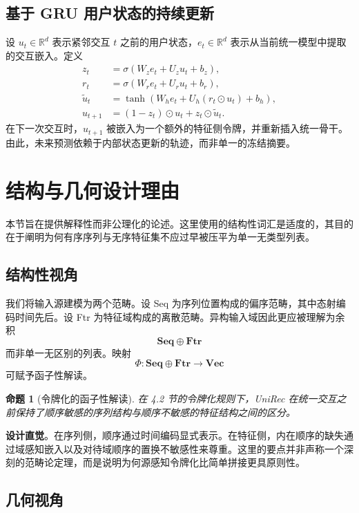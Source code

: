 \documentclass{article}
\newtheorem{proposition}{命题}
\begin{document}
\subsection{基于 GRU 用户状态的持续更新}

设 \(u_t \in \mathbb{R}^d\) 表示紧邻交互 \(t\) 之前的用户状态，\(e_t \in \mathbb{R}^d\) 表示从当前统一模型中提取的交互嵌入。定义
\[
\begin{aligned}
z_t &= \sigma(W_z e_t + U_z u_t + b_z),\\
r_t &= \sigma(W_r e_t + U_r u_t + b_r),\\
\tilde{u}_t &= \tanh(W_h e_t + U_h (r_t \odot u_t) + b_h),\\
u_{t+1} &= (1 - z_t) \odot u_t + z_t \odot \tilde{u}_t.
\end{aligned} \tag{4.10}
\]
在下一次交互时，\(u_{t+1}\) 被嵌入为一个额外的特征侧令牌，并重新插入统一骨干。由此，未来预测依赖于内部状态更新的轨迹，而非单一的冻结摘要。

\section{结构与几何设计理由}

本节旨在提供解释性而非公理化的论述。这里使用的结构性词汇是适度的，其目的在于阐明为何有序序列与无序特征集不应过早被压平为单一无类型列表。

\subsection{结构性视角}

我们将输入源建模为两个范畴。设 Seq 为序列位置构成的偏序范畴，其中态射编码时间先后。设 Ftr 为特征域构成的离散范畴。异构输入域因此更应被理解为余积
\[
\mathbf{Seq} \oplus \mathbf{Ftr}
\]
而非单一无区别的列表。映射
\[
\Phi: \mathbf{Seq} \oplus \mathbf{Ftr} \to \mathbf{Vec}
\]
可赋予函子性解读。

\begin{proposition}[令牌化的函子性解读]
在 4.2 节的令牌化规则下，UniRec 在统一交互之前保持了顺序敏感的序列结构与顺序不敏感的特征结构之间的区分。
\end{proposition}

\textbf{设计直觉}。在序列侧，顺序通过时间编码显式表示。在特征侧，内在顺序的缺失通过域感知嵌入以及对待域顺序的置换不敏感性来尊重。这里的要点并非声称一个深刻的范畴论定理，而是说明为何源感知令牌化比简单拼接更具原则性。

\subsection{几何视角}
\end{document}
